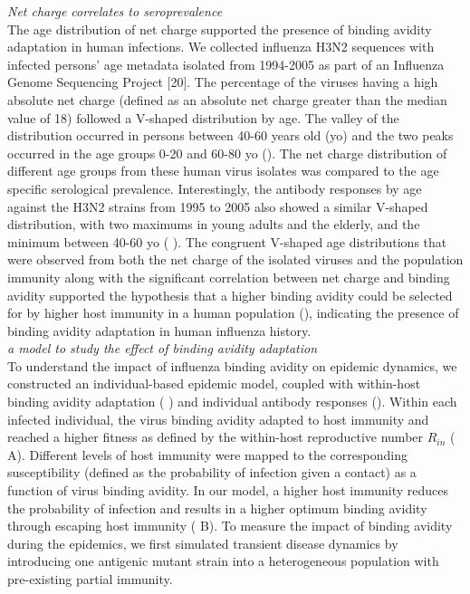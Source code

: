 \documentclass[12pt,a4paper]{article}
\begin{document}
{\it  Net charge correlates to seroprevalence} \\
The age distribution of net charge supported the presence of binding avidity adaptation in human infections. We collected influenza H3N2 sequences with infected persons’ age metadata isolated from 1994-2005 as part of an Influenza Genome Sequencing Project  [20]. The percentage of the viruses having a high absolute net charge (defined as an absolute net charge greater than the median value of 18) followed a V-shaped distribution by age. The valley of the distribution occurred in persons between 40-60 years old (yo) and the two peaks occurred in the age groups 0-20 and 60-80 yo (). The net charge distribution of different age groups from these human virus isolates was compared to the age specific serological prevalence. Interestingly, the antibody responses by age against the H3N2 strains from 1995 to 2005 also showed a similar V-shaped distribution, with two maximums in young adults and the elderly, and the minimum between 40-60 yo (\cite{Kucharski2015a} \cite{Kucharski2012}). The congruent V-shaped age distributions that were observed from both the net charge of the isolated viruses and the population immunity along with the significant correlation between net charge and binding avidity supported the hypothesis that a higher binding avidity could be selected for by higher host immunity in a human population  (\cite{Hensley2009}), indicating the presence of binding avidity adaptation in human influenza history.  \\

{\it  a model to study the effect of binding avidity adaptation } \\
To understand the impact of influenza binding avidity on epidemic dynamics, we constructed an individual-based epidemic model, coupled with within-host binding avidity adaptation (\cite{Hensley2009} \cite{Yuan2013}) and individual antibody responses (\cite{Yuan2016}). Within each infected individual, the virus binding avidity adapted to host immunity and reached a higher fitness as defined by the within-host reproductive number $R_{in}$ ( A). Different levels of host immunity were mapped to the corresponding susceptibility (defined as the probability of infection given a contact) as a function of  virus binding avidity. In our model, a higher host immunity reduces the probability of infection and results in  a higher optimum binding avidity through escaping host immunity ( B). To measure the impact of binding avidity during the epidemics, we first simulated transient disease dynamics by introducing one antigenic mutant strain into a heterogeneous population with pre-existing partial immunity. \\
\end{document}
